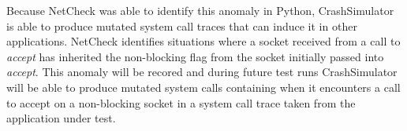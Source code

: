         Because NetCheck was able to identify this anomaly in Python, CrashSimulator is able to produce mutated system
        call traces that can induce it in other applications. NetCheck identifies situations where a socket received
        from a call to \emph{accept} has inherited the non-blocking flag from the socket initially passed into
        \emph{accept}. This anomaly will be recored and during future test runs CrashSimulator will be able to produce
        mutated system calls containing when it encounters a call to accept on a non-blocking socket in a system call
        trace taken from the application under test.
